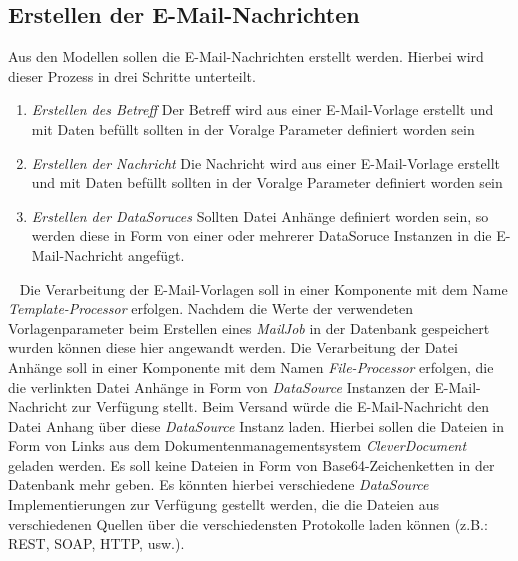 \subsection{Erstellen der E-Mail-Nachrichten}
Aus den Modellen sollen die E-Mail-Nachrichten erstellt werden. Hierbei wird dieser Prozess in drei Schritte unterteilt.
\begin{enumerate}
	\item\emph{Erstellen des Betreff}
	\newline
	Der Betreff wird aus einer E-Mail-Vorlage erstellt und mit Daten befüllt sollten in der Voralge Parameter definiert worden sein
	\item\emph{Erstellen der Nachricht}
	\newline
	Die Nachricht wird aus einer E-Mail-Vorlage erstellt und mit Daten befüllt sollten in der Voralge Parameter definiert worden sein
	\item\emph{Erstellen der DataSoruces}
	\newline
	Sollten Datei Anhänge definiert worden sein, so werden diese in Form von einer oder mehrerer DataSoruce Instanzen in die E-Mail-Nachricht angefügt.
\end{enumerate}
\ \newline
Die Verarbeitung der E-Mail-Vorlagen soll in einer Komponente mit dem Name \emph{Template-Processor} erfolgen. Nachdem die Werte der verwendeten Vorlagenparameter beim Erstellen eines \emph{MailJob} in der Datenbank gespeichert wurden können diese hier angewandt werden.
\newline
\newline
Die Verarbeitung der Datei Anhänge soll in einer Komponente mit dem Namen \emph{File-Processor} erfolgen, die die verlinkten Datei Anhänge in Form von \emph{DataSource} Instanzen der E-Mail-Nachricht zur Verfügung stellt. Beim Versand würde die E-Mail-Nachricht den Datei Anhang über diese \emph{DataSource} Instanz laden. Hierbei sollen die Dateien in Form von Links aus dem Dokumentenmanagementsystem \emph{CleverDocument} geladen werden. Es soll keine Dateien in Form von Base64-Zeichenketten in der Datenbank mehr geben. Es könnten hierbei verschiedene \emph{DataSource} Implementierungen zur Verfügung gestellt werden, die die Dateien aus verschiedenen Quellen über die verschiedensten Protokolle laden können (z.B.: REST, SOAP, HTTP, usw.).
